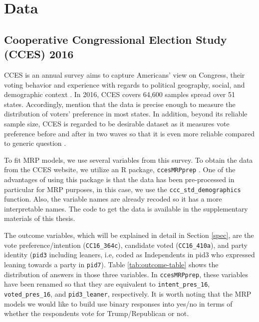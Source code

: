\documentclass{monashthesis}
\begin{document}
\hypertarget{data}{%
\section{Data}\label{data}}

\hypertarget{cooperative-congressional-election-study-cces-2016}{%
\subsection{Cooperative Congressional Election Study (CCES) 2016}\label{cooperative-congressional-election-study-cces-2016}}

CCES is an annual survey aims to capture Americans' view on Congress, their voting behavior and experience with regards to political geography, social, and demographic context \autocite{cces_data}. In 2016, CCES covers 64,600 samples spread over 51 states. Accordingly, \textcite{cces_data} mention that the data is precise enough to measure the distribution of voters' preference in most states. In addition, beyond its reliable sample size, CCES is regarded to be desirable dataset as it measures vote preference before and after in two waves so that it is even more reliable compared to generic question \autocite{kuriwaki}.

To fit MRP models, we use several variables from this survey. To obtain the data from the CCES website, we utilize an R package, \texttt{ccesMRPprep} \autocite{ccesmrpprep}. One of the advantages of using this package is that the data has been pre-processed in particular for MRP purposes, in this case, we use the \texttt{ccc\_std\_demographics} function. Also, the variable names are already recoded so it has a more interpretable names. The code to get the data is available in the supplementary materials of this thesis.

The outcome variables, which will be explained in detail in Section \ref{spec}, are the vote preference/intention (\texttt{CC16\_364c}), candidate voted (\texttt{CC16\_410a}), and party identity (\texttt{pid3} including leaners, i.e, coded as Independents in pid3 who expressed leaning towards a party in \texttt{pid7}). Table \ref{tab:outcome-table} shows the distribution of answers in those three variables. In \texttt{ccesMRPprep}, these variables have been renamed so that they are equivalent to \texttt{intent\_pres\_16}, \texttt{voted\_pres\_16}, and \texttt{pid3\_leaner}, respectively. It is worth noting that the MRP models we would like to build use binary responses into yes/no in terms of whether the respondents vote for Trump/Republican or not.
\end{document}

